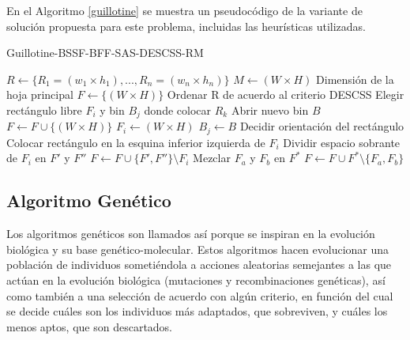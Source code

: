 \documentclass[a4paper,10pt,twocolumn]{article}
\begin{document}
En el Algoritmo \ref{guillotine} se muestra un pseudocódigo de la variante de solución propuesta para este problema, incluidas las heurísticas utilizadas. 

 
\algrenewcommand{}
\begin{algorithm}
\caption{Guillotine-BSSF-BFF-SAS-DESCSS-RM}\label{guillotine}
\begin{algorithmic}[1]
	\Require $R \gets \{ R_1 = (w_1 \times h_1), ..., R_n = (w_n \times h_n) \}$ $ M \gets (W \times H)$ \Comment Dimensión de la hoja principal
	\State $F \gets \{(W \times H)\}$
	\State Ordenar R de acuerdo al criterio DESCSS
		\State Elegir rectángulo libre $F_i$ y bin $B_j$ donde colocar $R_k$
			\State Abrir nuevo bin $B$
			\State $F \gets F \cup \{(W \times H)\}$
			\State $F_i \gets (W \times H)$
			\State $B_j \gets B$ 
		\EndIf
		\State Decidir orientación del rectángulo
		\State Colocar rectángulo en la esquina inferior izquierda de $F_i$
		\State Dividir espacio sobrante de $F_i$ en $F'$ y $F''$
		\State $F \gets F \cup \{F', F''\} \setminus F_i $
			\State Mezclar $F_a$ y $F_b$ en $F^*$
			\State $F \gets F \cup F^* \setminus \{F_a, F_b\}  $
		\EndWhile
	\EndFor
\end{algorithmic}
\end{algorithm}


\subsection{Algoritmo Genético}

Los algoritmos genéticos son llamados así porque se inspiran en la evolución biológica y su base genético-molecular. Estos algoritmos hacen evolucionar una población de individuos sometiéndola a acciones aleatorias semejantes a las que actúan en la evolución biológica (mutaciones y recombinaciones genéticas), así como también a una selección de acuerdo con algún criterio, en función del cual se decide cuáles son los individuos más adaptados, que sobreviven, y cuáles los menos aptos, que son descartados.\cite{5}
\end{document}
